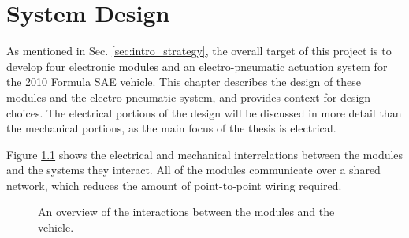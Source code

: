 \chapter{System Design\label{cha:design}}

As mentioned in Sec. \ref{sec:intro_strategy}, the overall target of this project is to develop four electronic modules and an electro-pneumatic actuation system for the 2010 Formula SAE vehicle. This chapter describes the design of these modules and the electro-pneumatic system, and provides context for design choices. The electrical portions of the design will be discussed in more detail than the mechanical portions, as the main focus of the thesis is electrical. 

Figure \ref{fig:design_overview} shows the electrical and mechanical interrelations between the modules and the systems they interact. All of the modules communicate over a shared network, which reduces the amount of point-to-point wiring required.

\begin{figure}[H]
	\centering
%	
	\caption{An overview of the interactions between the modules and the vehicle.}
	\label{fig:design_overview}
\end{figure}





